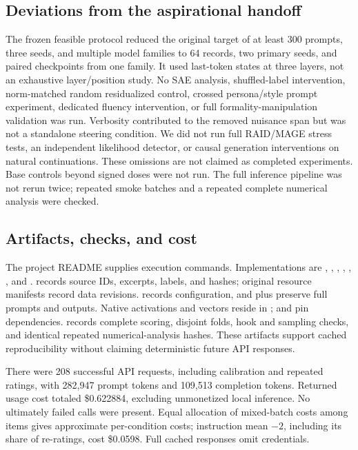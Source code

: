 \subsection{Deviations from the aspirational handoff}\label{sec:deviations}
The frozen feasible protocol reduced the original target of at least 300 prompts, three seeds, and multiple model families to 64 records, two primary seeds, and paired checkpoints from one family. It used last-token states at three layers, not an exhaustive layer/position study. No SAE analysis, shuffled-label intervention, norm-matched random residualized control, crossed persona/style prompt experiment, dedicated fluency intervention, or full formality-manipulation validation was run. Verbosity contributed to the removed nuisance span but was not a standalone steering condition. We did not run full \textsc{RAID}/\textsc{MAGE} stress tests, an independent likelihood detector, or causal generation interventions on natural \hape continuations. These omissions are not claimed as completed experiments. Base controls beyond signed doses were not run. The full inference pipeline was not rerun twice; repeated smoke batches and a repeated complete numerical analysis were checked.

\subsection{Artifacts, checks, and cost}
The project README supplies execution commands. Implementations are , , , , , , and .  records source IDs, excerpts, labels, and hashes; original resource manifests record data revisions.  records configuration, and  plus  preserve full prompts and outputs. Native activations and vectors reside in ;  and  pin dependencies.  records complete scoring, disjoint folds, hook and sampling checks, and identical repeated numerical-analysis hashes. These artifacts support cached reproducibility without claiming deterministic future API responses.

There were 208 successful API requests, including calibration and repeated ratings, with 282,947 prompt tokens and 109,513 completion tokens. Returned usage cost totaled \$0.622884, excluding unmonetized local inference. No ultimately failed calls were present. Equal allocation of mixed-batch costs among items gives approximate per-condition costs; instruction mean $-2$, including its share of re-ratings, cost \$0.0598. Full cached responses omit credentials.

